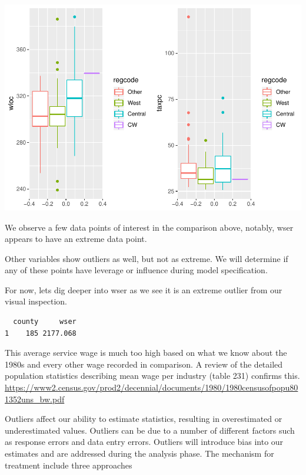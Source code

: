 \documentclass[]{article}
\newenvironment{Shaded}{}{}
\newcommand{\DecValTok}[1]{#1}
\newcommand{\KeywordTok}[1]{\textcolor[rgb]{0.00,0.00,1.00}{#1}}
\newcommand{\NormalTok}[1]{#1}
\newcommand{\OperatorTok}[1]{#1}
\newcommand{\StringTok}[1]{\textcolor[rgb]{0.00,0.50,0.50}{#1}}
\begin{document}
\includegraphics{Bagnard_Gaustad_Hartman_Leung_Lab_3_files/figure-latex/unnamed-chunk-15-5.pdf}

We observe a few data points of interest in the comparison above,
notably, wser appears to have an extreme data point.

Other variables show outliers as well, but not as extreme. We will
determine if any of these points have leverage or influence during model
specification.

For now, lets dig deeper into wser as we see it is an extreme outlier
from our visual inspection.

\begin{Shaded}
\end{Shaded}

\begin{verbatim}
  county     wser
1    185 2177.068
\end{verbatim}

This average service wage is much too high based on what we know about
the 1980s and every other wage recorded in comparison. A review of the
detailed population statistics describing mean wage per industry (table
231) confirms this.
\url{https://www2.census.gov/prod2/decennial/documents/1980/1980censusofpopu801352uns_bw.pdf}

Outliers affect our ability to estimate statistics, resulting in
overestimated or underestimated values. Outliers can be due to a number
of different factors such as response errors and data entry errors.
Outliers will introduce bias into our estimates and are addressed during
the analysis phase. The mechanism for treatment include three approaches
\end{document}
